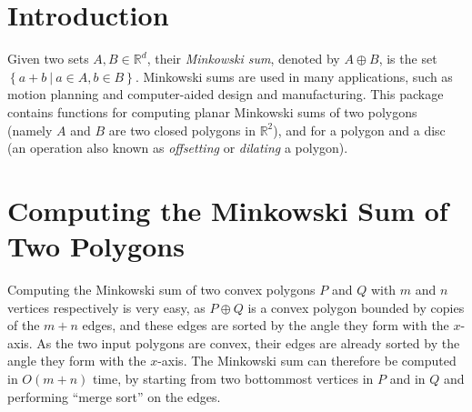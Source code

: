 \section{Introduction\label{mink_sec:intro}}
 
Given two sets $A,B \in \mathbb{R}^d$, their \emph{Minkowski sum},
denoted by $A \oplus B$, is the set $\left\{ a + b ~|~ a \in
A, b \in B \right\}$. Minkowski sums are used in many applications,
such as motion planning and computer-aided design and
manufacturing. This package contains functions for computing planar
Minkowski sums of two polygons (namely $A$ and $B$ are two closed
polygons in $\mathbb{R}^2$), and for a polygon and a disc (an operation
also known as \emph{offsetting} or \emph{dilating} a polygon).

\section{Computing the Minkowski Sum of Two Polygons\label{mink_sec:sum_poly}}

Computing the Minkowski sum of two convex polygons $P$ and $Q$ with
$m$ and $n$ vertices respectively is very easy, as $P \oplus Q$ is a
convex polygon bounded by copies of the $m + n$ edges, and these edges
are sorted by the angle they form with the $x$-axis. As the two
input polygons are convex, their edges are already sorted by the
angle they form with the $x$-axis. The Minkowski sum can therefore be
computed in $O(m + n)$ time, by starting from two bottommost vertices
in $P$ and in $Q$ and performing ``merge sort'' on the edges.

